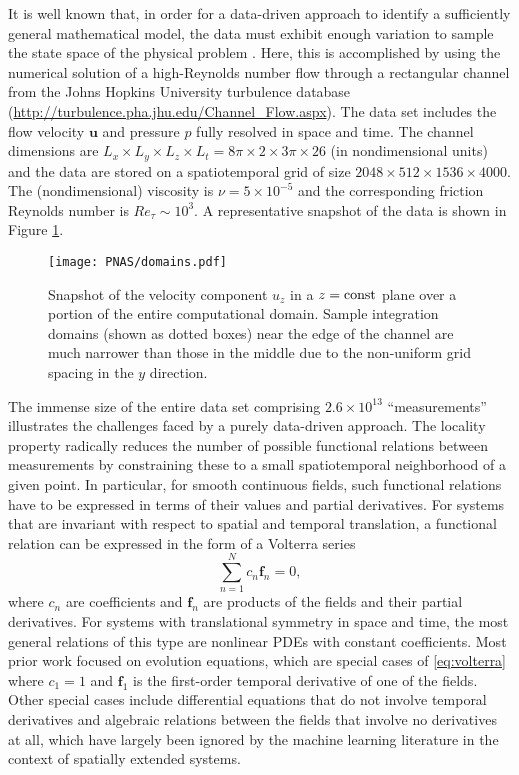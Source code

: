 \documentclass[preprint]{article}
\def\bi#1{\textbf{#1}}
\begin{document}
It is well known that, in order for a data-driven approach to identify a sufficiently general mathematical model, the data must exhibit enough variation to sample the state space of the physical problem \citep{schaeffer2018}. Here, this is accomplished by using the numerical solution of a high-Reynolds number flow through a rectangular channel from the Johns Hopkins University turbulence database (\url{http://turbulence.pha.jhu.edu/Channel_Flow.aspx}). %
The data set includes the flow velocity ${\bi u}$ and pressure $p$ fully resolved in space and time. The channel dimensions are $L_x\times L_y\times L_z\times L_t=8\pi\times 2\times 3\pi\times 26$ (in nondimensional units) and the data are stored on a spatiotemporal grid of size $2048\times 512\times 1536\times 4000$. The (nondimensional) viscosity is $\nu=5\times 10^{-5}$ and the corresponding friction Reynolds number is $Re_\tau \sim 10^3$. A representative snapshot of the data is shown in Figure \ref{fig:domains}. 

\begin{figure}
\centering
\texttt{[image: PNAS/domains.pdf]}
\caption{Snapshot of the velocity component $u_z$ in a $z={\rm const}$ plane over a portion of the entire computational domain. Sample integration domains (shown as dotted boxes) near the edge of the channel are much narrower than those in the middle due to the non-uniform grid spacing in the $y$ direction.
}
\label{fig:domains}
\end{figure}

The immense size of the entire data set comprising $2.6\times 10^{13}$ ``measurements'' illustrates the challenges faced by a purely data-driven approach. The locality property radically reduces the number of possible functional relations between measurements by constraining these to a small spatiotemporal neighborhood of a given point. In particular, for smooth continuous fields, such functional relations have to be expressed in terms of their values and partial derivatives. For systems that are invariant with respect to spatial and temporal translation,
a functional relation can be expressed in the form of a Volterra series
\begin{equation}\label{eq:volterra}
\sum_{n=1}^N c_n {\bi f}_n = 0,
\end{equation}
where $c_n$ are coefficients and ${\bi f}_n$ are products of the fields and their partial derivatives. For systems with translational symmetry in space and time, the most general relations of this type are nonlinear PDEs with constant coefficients. Most prior work focused on evolution equations, which are special cases of \eqref{eq:volterra} where $c_1=1$ and ${\bi f}_1$ is the first-order temporal derivative of one of the fields. Other special cases include differential equations that do not involve temporal derivatives and algebraic relations between the fields that involve no derivatives at all, which have largely been ignored by the machine learning literature in the context of spatially extended systems.
\end{document}
